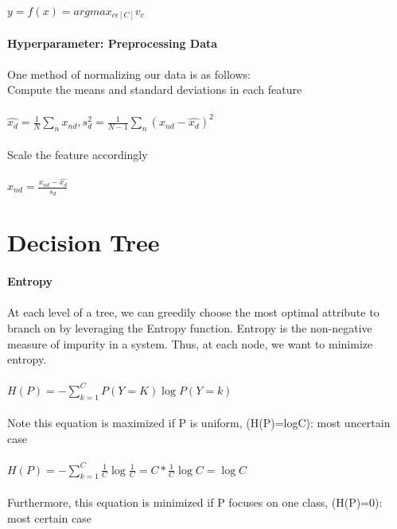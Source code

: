 \documentclass{article}
\begin{document}
\paragraph{}
\(y=f(x)=argmax_{c\epsilon[C]}v_c\)
\paragraph{Hyperparameter: Preprocessing Data}
\paragraph{}
One method of normalizing our data is as follows:\\
Compute the means and standard deviations in each feature
\paragraph{}
\(\hat{x_d} = \frac{1}{N}\sum_nx_{nd}, s_d^2=\frac{1}{N-1}\sum_n(x_{nd}-\hat{x_d})^2\)\\\\
Scale the feature accordingly
\paragraph{}
\(x_{nd} = \frac{x_{nd}-\hat{x_d}}{s_d}\)

\section{Decision Tree}
\paragraph{Entropy}
\paragraph{}
At each level of a tree, we can greedily choose the most optimal attribute to branch on by leveraging the Entropy function. Entropy is the non-negative measure of impurity in a system. Thus, at each node, we want to minimize entropy.
\paragraph{}
\(H(P) = -\sum_{k=1}^C P(Y=K)\log P(Y=k)\)\\\\
Note this equation is maximized if P is uniform, (H(P)=logC): most uncertain case
\paragraph{}
\(H(P) = -\sum_{k=1}^C \frac{1}{C}\log \frac{1}{C}=C*\frac{1}{C}\log C = \log C\)\\\\
Furthermore, this equation is minimized if P focuses on one class, (H(P)=0): most certain case
\end{document}
